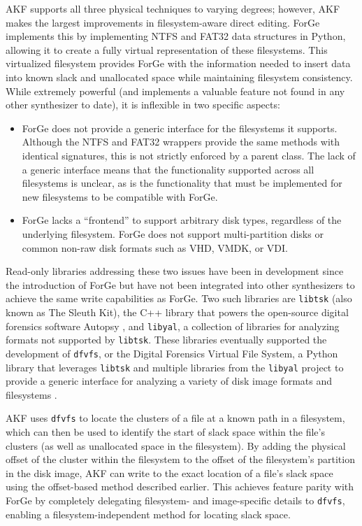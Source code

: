 \documentclass[final,5p,times,twocolumn]{elsarticle}
\newcommand{\passthrough}[1]{#1}
\begin{document}
AKF supports all three physical techniques to varying degrees; however,
AKF makes the largest improvements in filesystem-aware direct editing.
ForGe \cite{vistiAutomaticCreationComputer2015} implements this by
implementing NTFS and FAT32 data structures in Python, allowing it to
create a fully virtual representation of these filesystems. This
virtualized filesystem provides ForGe with the information needed to
insert data into known slack and unallocated space while maintaining
filesystem consistency. While extremely powerful (and implements a
valuable feature not found in any other synthesizer to date), it is
inflexible in two specific aspects:

\begin{itemize}
\item
  ForGe does not provide a generic interface for the filesystems it
  supports. Although the NTFS and FAT32 wrappers provide the same
  methods with identical signatures, this is not strictly enforced by a
  parent class. The lack of a generic interface means that the
  functionality supported across all filesystems is unclear, as is the
  functionality that must be implemented for new filesystems to be
  compatible with ForGe.
\item
  ForGe lacks a ``frontend'' to support arbitrary disk types, regardless
  of the underlying filesystem. ForGe does not support multi-partition
  disks or common non-raw disk formats such as VHD, VMDK, or VDI.
\end{itemize}

Read-only libraries addressing these two issues have been in development
since the introduction of ForGe but have not been integrated into other
synthesizers to achieve the same write capabilities as ForGe. Two such
libraries are \passthrough{\lstinline!libtsk!} (also known as The Sleuth
Kit), the C++ library that powers the open-source digital forensics
software Autopsy \cite{SleuthkitSleuthkit2025}, and
\passthrough{\lstinline!libyal!}, a collection of libraries for
analyzing formats not supported by \passthrough{\lstinline!libtsk!}.
These libraries eventually supported the development of
\passthrough{\lstinline!dfvfs!}, or the Digital Forensics Virtual File
System, a Python library that leverages \passthrough{\lstinline!libtsk!}
and multiple libraries from the \passthrough{\lstinline!libyal!} project
to provide a generic interface for analyzing a variety of disk image
formats and filesystems \cite{Log2timelineDfvfs2025}.

AKF uses \passthrough{\lstinline!dfvfs!} to locate the clusters of a
file at a known path in a filesystem, which can then be used to identify
the start of slack space within the file's clusters (as well as
unallocated space in the filesystem). By adding the physical offset of
the cluster within the filesystem to the offset of the filesystem's
partition in the disk image, AKF can write to the exact location of a
file's slack space using the offset-based method described earlier. This
achieves feature parity with ForGe by completely delegating filesystem-
and image-specific details to \passthrough{\lstinline!dfvfs!}, enabling
a filesystem-independent method for locating slack space.
\end{document}
